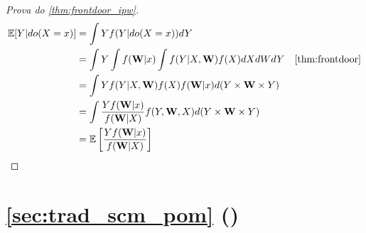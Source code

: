 \begin{proof}[Prova do \cref{thm:frontdoor_ipw}]
 \begin{align*}
  \E[Y|do(X=x)]
  &= \int Y f(Y|do(X=x)) dY \\
  &= \int Y \int f(\W|x) \int f(Y|X,\W)f(X)dXdWdY 
  & \text{\cref{thm:frontdoor}} \\
  &= \int Y f(Y|X,\W)f(X) f(\W|x) d(Y \times \W \times Y) \\
  &= \int \frac{Y f(\W|x)}{f(\W|X)} f(Y,\W,X) d(Y \times \W \times Y) \\
  &= \E\left[\frac{Y f(\W|x)}{f(\W|X)} \right]
 \end{align*}
\end{proof}

\section{\cref{sec:trad_scm_pom} ()}

